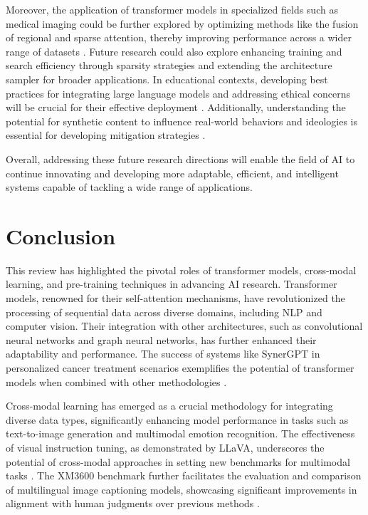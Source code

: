 Moreover, the application of transformer models in specialized fields such as medical imaging could be further explored by optimizing methods like the fusion of regional and sparse attention, thereby improving performance across a wider range of datasets \cite{le2019evolvingselfsupervisedneuralnetworks}. Future research could also explore enhancing training and search efficiency through sparsity strategies and extending the architecture sampler for broader applications. In educational contexts, developing best practices for integrating large language models and addressing ethical concerns will be crucial for their effective deployment \cite{korre2023takesvillagemultidisciplinaritycollaboration}. Additionally, understanding the potential for synthetic content to influence real-world behaviors and ideologies is essential for developing mitigation strategies \cite{mcguffie2020radicalizationrisksgpt3advanced}.



Overall, addressing these future research directions will enable the field of AI to continue innovating and developing more adaptable, efficient, and intelligent systems capable of tackling a wide range of applications.







\section{Conclusion} \label{sec:Conclusion}





This review has highlighted the pivotal roles of transformer models, cross-modal learning, and pre-training techniques in advancing AI research. Transformer models, renowned for their self-attention mechanisms, have revolutionized the processing of sequential data across diverse domains, including NLP and computer vision. Their integration with other architectures, such as convolutional neural networks and graph neural networks, has further enhanced their adaptability and performance. The success of systems like SynerGPT in personalized cancer treatment scenarios exemplifies the potential of transformer models when combined with other methodologies \cite{edwards2023synergptincontextlearningpersonalized}.



Cross-modal learning has emerged as a crucial methodology for integrating diverse data types, significantly enhancing model performance in tasks such as text-to-image generation and multimodal emotion recognition. The effectiveness of visual instruction tuning, as demonstrated by LLaVA, underscores the potential of cross-modal approaches in setting new benchmarks for multimodal tasks \cite{liu2024visual}. The XM3600 benchmark further facilitates the evaluation and comparison of multilingual image captioning models, showcasing significant improvements in alignment with human judgments over previous methods \cite{thapliyal2022crossmodal3600massivelymultilingualmultimodal}.



